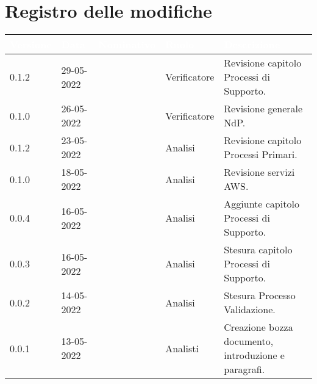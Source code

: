 \section*{Registro delle modifiche}
{

\newlength{\freewidth}
\setlength{\freewidth}{\dimexpr\textwidth-10\tabcolsep}
\renewcommand{\arraystretch}{1.5}
\centering
\setlength{\aboverulesep}{0pt}
\setlength{\belowrulesep}{0pt}
\begin{longtable}{C{.13\freewidth} C{.15\freewidth} C{.26\freewidth} C{.18\freewidth} C{.282379\freewidth}}
	\toprule
{}
\textcolor{white}{\textbf{Versione}}&
\textcolor{white}{\textbf{Data}}&
\textcolor{white}{\textbf{Nominativo}}&
\textcolor{white}{\textbf{Ruolo}}&
\textcolor{white}{\textbf{Descrizione}}\\	
\toprule
\endhead

0.1.2 & 29-05-2022 & \matteo{} & Verificatore & Revisione capitolo Processi di Supporto.\\
0.1.0 & 26-05-2022 & \marcov{} & Verificatore & Revisione generale NdP.\\
0.1.2 & 23-05-2022 & \matteo{} & Analisi & Revisione capitolo Processi Primari.\\
0.1.0 & 18-05-2022 & \marcov{} & Analisi & Revisione servizi AWS.\\
0.0.4 & 16-05-2022 & \matteo{} & Analisi & Aggiunte capitolo Processi di Supporto.\\
0.0.3 & 16-05-2022 & \marcov{} & Analisi & Stesura capitolo Processi di Supporto.\\		
0.0.2 & 14-05-2022 & \matteo{} & Analisi & Stesura Processo Validazione.\\
0.0.1 & 13-05-2022 & \teamname{} & Analisti & Creazione bozza documento, introduzione e paragrafi.\\	
\bottomrule
\end{longtable}
}
